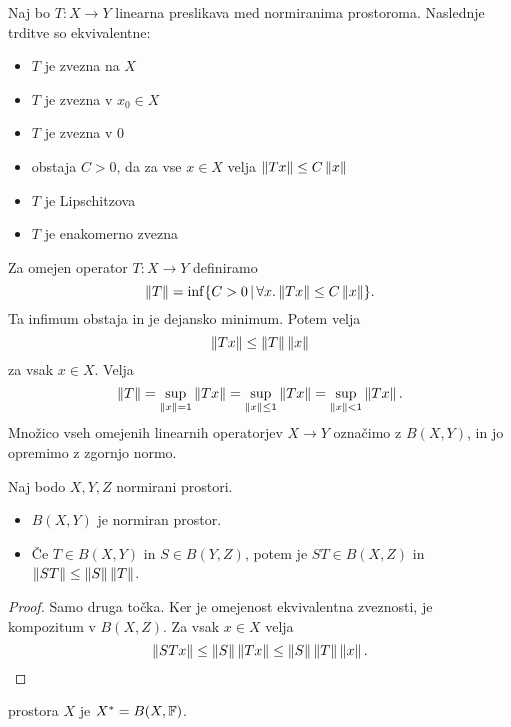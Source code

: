 
\begin{izrek}
  Naj bo $T: X \to Y$ linearna preslikava med normiranima prostoroma.
  Naslednje trditve so ekvivalentne:
  \begin{itemize}
  \item $T$ je zvezna na $X$
  \item $T$ je zvezna v $x_0 \in X$
  \item $T$ je zvezna v $0$
  \item obstaja $C > 0$, da za vse $x \in X$ velja $\left\lVert Tx\right\rVert \le C \left\lVert x\right\rVert$
  \item $T$ je Lipschitzova
  \item $T$ je enakomerno zvezna
  \end{itemize}
\end{izrek}


Za omejen operator $T: X \to Y$ definiramo
\[
  \left\lVert T\right\rVert = \inf \{ C > 0 \,|\, \forall x . \left\lVert Tx\right\rVert \le C \left\lVert x\right\rVert \}.
\]
Ta infimum obstaja in je dejansko minimum.
Potem velja
\[
  \left\lVert Tx\right\rVert \le \left\lVert T\right\rVert \left\lVert x\right\rVert
\]
za vsak $x \in X$.
Velja
\[
  \left\lVert T\right\rVert = \sup_{\left\lVert x\right\rVert = 1} \left\lVert Tx\right\rVert
  = \sup_{\left\lVert x\right\rVert \le 1} \left\lVert Tx\right\rVert
  = \sup_{\left\lVert x\right\rVert < 1} \left\lVert Tx\right\rVert.
\]
Množico vseh omejenih linearnih operatorjev $X \to Y$ označimo z $B(X,Y)$, in jo
opremimo z zgornjo normo.


\begin{trditev}
  Naj bodo $X, Y, Z$ normirani prostori.
  \begin{itemize}
  \item $B(X,Y)$ je normiran prostor.
  \item Če $T \in B(X,Y)$ in $S \in B(Y,Z)$, potem je $ST \in B(X,Z)$ in
	$\left\lVert ST\right\rVert \le \left\lVert S\right\rVert \left\lVert T\right\rVert$.
  \end{itemize}
\end{trditev}

\begin{proof}
  Samo druga točka.
  Ker je omejenost ekvivalentna zveznosti, je kompozitum v $B(X,Z)$.
  Za vsak $x \in X$ velja
  \[
	\left\lVert STx\right\rVert \le \left\lVert S\right\rVert \left\lVert Tx\right\rVert \le \left\lVert S\right\rVert \left\lVert T\right\rVert \left\lVert x\right\rVert.
	\qedhere
  \]
\end{proof}

\begin{definicija}
   prostora $X$ je $X^* = B(X, \mathbb{F})$.
\end{definicija}

